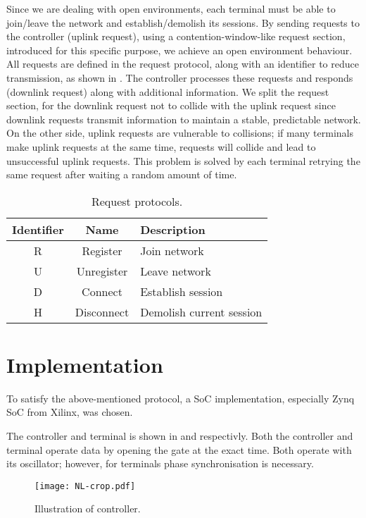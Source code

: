 ﻿\documentclass[twocolumn,9pt]{ltjsarticle}
\renewcommand{\ref}{\Cref}
\begin{document}
Since we are dealing with open environments, each terminal must be able to join/leave the network and establish/demolish its sessions.
By sending requests to the controller (uplink request), using a contention-window-like request section, introduced for this specific purpose, we achieve an open environment behaviour.
All requests are defined in the request protocol, along with an identifier to reduce transmission, as shown in \ref{tab:request}.
The controller processes these requests and responds (downlink request) along with additional information.
We split the request section, for the downlink request not to collide with the uplink request since downlink requests transmit information to maintain a stable, predictable network.
On the other side, uplink requests are vulnerable to collisions; if many terminals make uplink requests at the same time, requests will collide and lead to unsuccessful uplink requests.
This problem is solved by each terminal retrying the same request after waiting a random amount of time.
\begin{table}[tb]
  \centering
  \small
  \caption{\label{tab:request}
    Request protocols.
  }
  \begin{tabularx}{\linewidth}{ccl}
    \hline
    Identifier & Name & Description\\
    \hline \hline
    R & Register & Join network\\
    U & Unregister & Leave network\\
    D & Connect & Establish session\\
    H & Disconnect & Demolish current session\\
    \hline
  \end{tabularx}
\end{table}

\section{Implementation}
To satisfy the above-mentioned protocol, a SoC implementation, especially Zynq SoC from Xilinx\textregistered, was chosen.

The controller and terminal is shown in \ref{fig:controller} and \ref{fig:terminal} respectivly.
Both the controller and terminal operate data by opening the gate at the exact time.
Both operate with its oscillator; however, for terminals phase synchronisation is necessary.

\begin{figure}[tb]
  \centering
  \texttt{[image: NL-crop.pdf]}
  \caption{\label{fig:controller}
    Illustration of controller.
  }
\end{figure}
\end{document}
